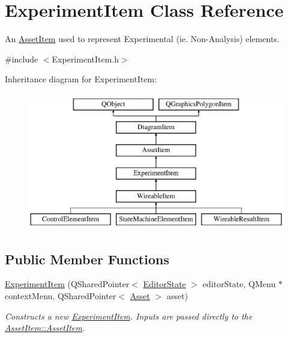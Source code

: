 \hypertarget{class_experiment_item}{\section{Experiment\-Item Class Reference}
\label{class_experiment_item}
}


An \hyperlink{class_asset_item}{Asset\-Item} used to represent Experimental (ie. Non-\/\-Analysis) elements.  




{\ttfamily \#include $<$Experiment\-Item.\-h$>$}

Inheritance diagram for Experiment\-Item\-:\begin{figure}[H]
\begin{center}
\leavevmode
\includegraphics[height=6.000000cm]{class_experiment_item}
\end{center}
\end{figure}
\subsection*{Public Member Functions}
\begin{DoxyCompactItemize}
\item 
\hypertarget{class_experiment_item_a8bc01fdf59af7a195c831c3b534dbb25}{\hyperlink{class_experiment_item_a8bc01fdf59af7a195c831c3b534dbb25}{Experiment\-Item} (Q\-Shared\-Pointer$<$ \hyperlink{class_editor_state}{Editor\-State} $>$ editor\-State, Q\-Menu $\ast$context\-Menu, Q\-Shared\-Pointer$<$ \hyperlink{class_picto_1_1_asset}{Asset} $>$ asset)}\label{class_experiment_item_a8bc01fdf59af7a195c831c3b534dbb25}

\begin{DoxyCompactList}\small\item\em Constructs a new \hyperlink{class_experiment_item}{Experiment\-Item}. Inputs are passed directly to the \hyperlink{class_asset_item_a3a906a41b88bfa28ba3ac56c66004713}{Asset\-Item\-::\-Asset\-Item}. \end{DoxyCompactList}\end{DoxyCompactItemize}
